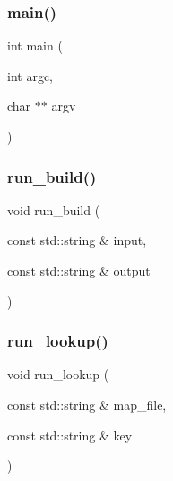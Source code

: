\subsubsection{\texorpdfstring{main()}{main()}}
{\footnotesize\ttfamily int main (\begin{DoxyParamCaption}\item[{int}]{argc,  }\item[{char $\ast$$\ast$}]{argv }\end{DoxyParamCaption})}

\mbox{\label{irk-prefmap_8cpp_a4330c09b4157029d4e97f57d221f54ea}} 
\subsubsection{\texorpdfstring{run\+\_\+build()}{run\_build()}}
{\footnotesize\ttfamily void run\+\_\+build (\begin{DoxyParamCaption}\item[{const std\+::string \&}]{input,  }\item[{const std\+::string \&}]{output }\end{DoxyParamCaption})}

\mbox{\label{irk-prefmap_8cpp_a3297f4a7dd9fab2d2fc9860efc147021}} 
\subsubsection{\texorpdfstring{run\+\_\+lookup()}{run\_lookup()}}
{\footnotesize\ttfamily void run\+\_\+lookup (\begin{DoxyParamCaption}\item[{const std\+::string \&}]{map\+\_\+file,  }\item[{const std\+::string \&}]{key }\end{DoxyParamCaption})}

